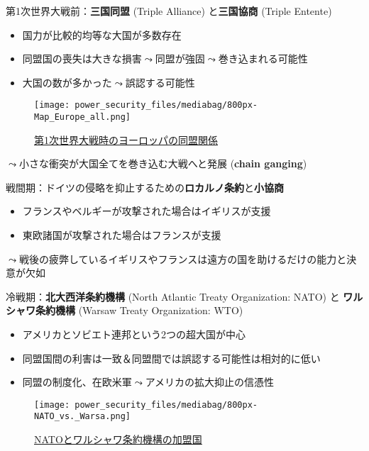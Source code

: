 \documentclass[
  xelatex,
  ja=standard]{bxjsarticle}
\providecommand{\tightlist}{%
  \setlength{\itemsep}{0pt}\setlength{\parskip}{0pt}}\usepackage{longtable,booktabs,array}
\begin{document}
第1次世界大戦前：\textbf{三国同盟} (Triple Alliance) と\textbf{三国協商}
(Triple Entente)

\begin{itemize}
\tightlist
\item
  国力が比較的均等な大国が多数存在
\item
  同盟国の喪失は大きな損害\(\leadsto\)同盟が強固\(\leadsto\)巻き込まれる可能性
\item
  大国の数が多かった\(\leadsto\)誤認する可能性
\end{itemize}

\begin{figure}[htpb]

{\centering \texttt{[image: power\_security\_files/mediabag/800px-Map\_Europe\_all.png]}

}

\caption{\href{https://commons.wikimedia.org/wiki/File:Map_Europe_alliances_1914-en.svg}{第1次世界大戦時のヨーロッパの同盟関係}}

\end{figure}

\(\leadsto\)小さな衝突が大国全てを巻き込む大戦へと発展 (\textbf{chain
ganging})\citep{christensen1990}

戦間期：ドイツの侵略を抑止するための\textbf{ロカルノ条約}と\textbf{小協商}

\begin{itemize}
\tightlist
\item
  フランスやベルギーが攻撃された場合はイギリスが支援
\item
  東欧諸国が攻撃された場合はフランスが支援
\end{itemize}

\(\leadsto\)戦後の疲弊しているイギリスやフランスは遠方の国を助けるだけの能力と決意が欠如

冷戦期：\textbf{北大西洋条約機構} (North Atlantic Treaty Organization:
NATO) と \textbf{ワルシャワ条約機構} (Warsaw Treaty Organization: WTO)

\begin{itemize}
\tightlist
\item
  アメリカとソビエト連邦という2つの超大国が中心
\item
  同盟国間の利害は一致＆同盟間では誤認する可能性は相対的に低い
\item
  同盟の制度化、在欧米軍\(\leadsto\)アメリカの拡大抑止の信憑性
\end{itemize}

\begin{figure}[htpb]

{\centering \texttt{[image: power\_security\_files/mediabag/800px-NATO\_vs.\_Warsa.png]}

}

\caption{\href{https://commons.wikimedia.org/wiki/File:NATO_vs._Warsaw_(1949-1990).svg}{NATOとワルシャワ条約機構の加盟国}}

\end{figure}
\end{document}
